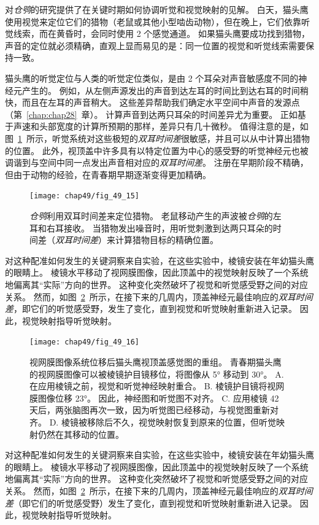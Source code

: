 对\textit{仓鸮}的研究提供了在关键时期如何协调听觉和视觉映射的见解。
白天，猫头鹰使用视觉来定位它们的猎物（老鼠或其他小型啮齿动物），但在晚上，它们依靠听觉线索，而在黄昏时，会同时使用 2 个感觉通道。
如果猫头鹰要成功找到猎物，声音的定位就必须精确，直观上显而易见的是：同一位置的视觉和听觉线索需要保持一致。


猫头鹰的听觉定位与人类的听觉定位类似，是由 2 个耳朵对声音敏感度不同的神经元产生的。
例如，从左侧声源发出的声音到达左耳的时间比到达右耳的时间稍快，而且在左耳的声音稍大。
这些差异帮助我们确定水平空间中声音的发源点（第~\ref{chap:chap28}~章）。
计算声音到达两只耳朵的时间差异尤为重要。
正如基于声速和头部宽度的计算所预期的那样，差异只有几十微秒。
值得注意的是，如图~\ref{fig:49_15}~所示，听觉系统对这些极短的\textit{双耳时间差}很敏感，并且可以从中计算出猎物的位置。
此外，视顶盖中许多具有以特定位置为中心的感受野的听觉神经元也被调谐到与空间中同一点发出声音相对应的\textit{双耳时间差}。
注册在早期阶段不精确，但由于动物的经验，在青春期早期逐渐变得更加精确。


\begin{figure}[htbp]
	\centering
	\texttt{[image: chap49/fig\_49\_15]}
	\caption{\textit{仓鸮}利用双耳时间差来定位猎物。
		老鼠移动产生的声波被\textit{仓鸮}的左耳和右耳接收。
		当猎物发出噪音时，用听觉刺激到达两只耳朵的时间差（\textit{双耳时间差}）来计算猎物目标的精确位置。}
	\label{fig:49_15}
\end{figure}


对这种配准如何发生的关键洞察来自实验，在这些实验中，棱镜安装在年幼猫头鹰的眼睛上。
棱镜水平移动了视网膜图像，因此顶盖中的视觉映射反映了一个系统地偏离其“实际”方向的世界。
这种变化突然破坏了视觉和听觉感受野之间的对应关系。 
然而，如图~\ref{fig:49_16}~所示，在接下来的几周内，顶盖神经元最佳响应的\textit{双耳时间差}，即它们的听觉感受野，发生了变化，直到视觉和听觉映射重新进入记录。 
因此，视觉映射指导听觉映射。


\begin{figure}[htbp]
	\centering
	\texttt{[image: chap49/fig\_49\_16]}
	\caption{视网膜图像系统位移后猫头鹰视顶盖感觉图的重组。
		青春期猫头鹰的视网膜图像可以被棱镜护目镜移位，将图像从 5° 移动到 30°\cite{knudsen2002instructed}。
		A. 在应用棱镜之前，视觉和听觉神经映射重合。
		B. 棱镜护目镜将视网膜图像位移 23°。
		因此，神经图和听觉图不对齐。
		C. 应用棱镜 42 天后，两张脑图再次一致，因为听觉图已经移动，与视觉图重新对齐。
		D. 棱镜被移除后不久，视觉映射恢复到原来的位置，但听觉映射仍然在其移动的位置。}
	\label{fig:49_16}
\end{figure}

对这种配准如何发生的关键洞察来自实验，在这些实验中，棱镜安装在年幼猫头鹰的眼睛上。
棱镜水平移动了视网膜图像，因此顶盖中的视觉映射反映了一个系统地偏离其“实际”方向的世界。
这种变化突然破坏了视觉和听觉感受野之间的对应关系。
然而，如图~\ref{fig:49_16}~所示，在接下来的几周内，顶盖神经元最佳响应的\textit{双耳时间差}（即它们的听觉感受野）发生了变化，直到视觉和听觉映射重新进入记录。
因此，视觉映射指导听觉映射。


